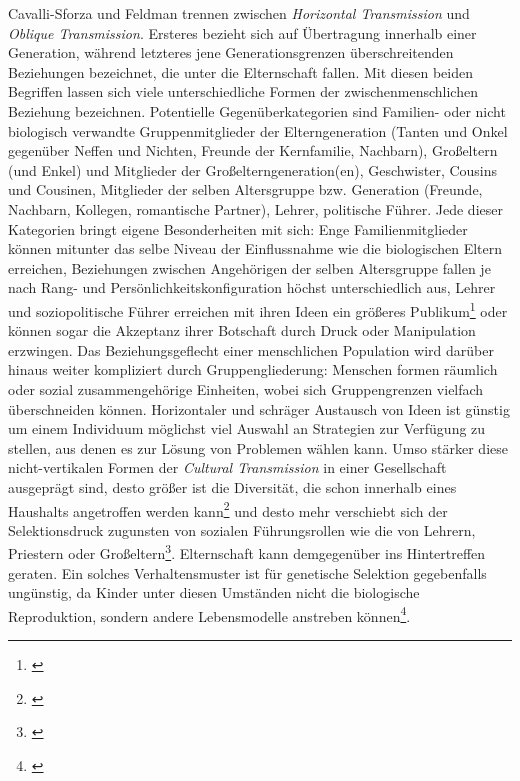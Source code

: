 \documentclass[openany,twoside,twocolumn]{book}
\let\rmarkdownfootnote\footnote%
\def\footnote{\protect\rmarkdownfootnote}
\begin{document}
Cavalli-Sforza und Feldman trennen zwischen \emph{Horizontal
Transmission} und \emph{Oblique Transmission}. Ersteres bezieht sich auf
Übertragung innerhalb einer Generation, während letzteres jene
Generationsgrenzen überschreitenden Beziehungen bezeichnet, die unter
die Elternschaft fallen. Mit diesen beiden Begriffen lassen sich viele
unterschiedliche Formen der zwischenmenschlichen Beziehung bezeichnen.
Potentielle Gegenüberkategorien sind Familien- oder nicht biologisch
verwandte Gruppenmitglieder der Elterngeneration (Tanten und Onkel
gegenüber Neffen und Nichten, Freunde der Kernfamilie, Nachbarn),
Großeltern (und Enkel) und Mitglieder der Großelterngeneration(en),
Geschwister, Cousins und Cousinen, Mitglieder der selben Altersgruppe
bzw. Generation (Freunde, Nachbarn, Kollegen, romantische Partner),
Lehrer, politische Führer. Jede dieser Kategorien bringt eigene
Besonderheiten mit sich: Enge Familienmitglieder können mitunter das
selbe Niveau der Einflussnahme wie die biologischen Eltern erreichen,
Beziehungen zwischen Angehörigen der selben Altersgruppe fallen je nach
Rang- und Persönlichkeitskonfiguration höchst unterschiedlich aus,
Lehrer und soziopolitische Führer erreichen mit ihren Ideen ein größeres
Publikum\footnote{\textcite{fogarty_evolution_2011}} oder können sogar
die Akzeptanz ihrer Botschaft durch Druck oder Manipulation erzwingen.
Das Beziehungsgeflecht einer menschlichen Population wird darüber hinaus
weiter kompliziert durch Gruppengliederung: Menschen formen räumlich
oder sozial zusammengehörige Einheiten, wobei sich Gruppengrenzen
vielfach überschneiden können. Horizontaler und schräger Austausch von
Ideen ist günstig um einem Individuum möglichst viel Auswahl an
Strategien zur Verfügung zu stellen, aus denen es zur Lösung von
Problemen wählen kann. Umso stärker diese nicht-vertikalen Formen der
\emph{Cultural Transmission} in einer Gesellschaft ausgeprägt sind,
desto größer ist die Diversität, die schon innerhalb eines Haushalts
angetroffen werden kann\footnote{\textcite{shennan_genes_2002}} und
desto mehr verschiebt sich der Selektionsdruck zugunsten von sozialen
Führungsrollen wie die von Lehrern, Priestern oder Großeltern\footnote{\textcite{macdonald_subsistence_1998}}.
Elternschaft kann demgegenüber ins Hintertreffen geraten. Ein solches
Verhaltensmuster ist für genetische Selektion gegebenfalls ungünstig, da
Kinder unter diesen Umständen nicht die biologische Reproduktion,
sondern andere Lebensmodelle anstreben können\footnote{\textcite{smith_cultural_1992}}.
\end{document}
